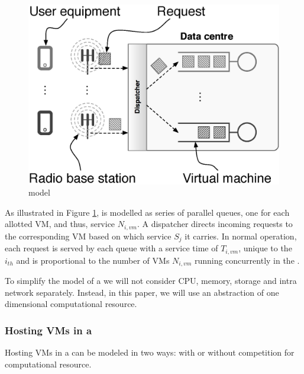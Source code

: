 \subsection{\Dc}
\begin{figure}[tb]
	\centering
	\includegraphics[width=\linewidth]{fig_dc_model.eps} 
	\caption{\Dc{} model}
	\label{fig:dc_model}
\end{figure}

As illustrated in Figure \ref{fig:dc_model}, \dc{} is modelled as series of parallel queues, one for each allotted VM, and thus, service $N_{i,vm}$. 
A dispatcher directs incoming requests to the corresponding VM based on which service $S_j$ it carries. 
In normal operation, each request is served by each queue with a service time of $T_{i,vm}$, unique to the $i_{th}$ \dc{} and is proportional to the number of VMs $N_{i,vm}$ running concurrently in the \dc{}.

To simplify the model of a \dc{} we will not consider CPU, memory, storage and intra \dc{} network separately.
Instead, in this paper, we will use an abstraction of one dimensional computational resource.

\subsubsection{Hosting VMs in a \dc{}}
Hosting VMs in a \dc{} can be modeled in two ways: with or without competition for computational resource.

